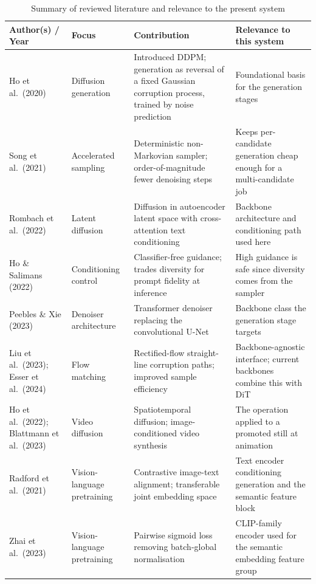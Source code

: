 \documentclass[conference]{IEEEtran}
\begin{document}
\begin{table}[t]
\caption{Summary of reviewed literature and relevance to the present system}
\label{tab:lit}
\centering
\tiny
\begin{tabular}{@{}p{2.7cm}p{2.3cm}p{5.0cm}p{5.4cm}@{}}
\toprule
\textbf{Author(s) / Year} & \textbf{Focus} & \textbf{Contribution} & \textbf{Relevance to this system} \\
\midrule
Ho et al.\ (2020) \cite{ho2020ddpm} & Diffusion generation & Introduced DDPM; generation as reversal of a fixed Gaussian corruption process, trained by noise prediction & Foundational basis for the generation stages \\
Song et al.\ (2021) \cite{song2021ddim} & Accelerated sampling & Deterministic non-Markovian sampler; order-of-magnitude fewer denoising steps & Keeps per-candidate generation cheap enough for a multi-candidate job \\
Rombach et al.\ (2022) \cite{rombach2022ldm} & Latent diffusion & Diffusion in autoencoder latent space with cross-attention text conditioning & Backbone architecture and conditioning path used here \\
Ho \& Salimans (2022) \cite{ho2022cfg} & Conditioning control & Classifier-free guidance; trades diversity for prompt fidelity at inference & High guidance is safe since diversity comes from the sampler \\
Peebles \& Xie (2023) \cite{peebles2023dit} & Denoiser architecture & Transformer denoiser replacing the convolutional U-Net & Backbone class the generation stage targets \\
Liu et al.\ (2023); Esser et al.\ (2024) \cite{liu2023rectflow,esser2024sd3} & Flow matching & Rectified-flow straight-line corruption paths; improved sample efficiency & Backbone-agnostic interface; current backbones combine this with DiT \\
Ho et al.\ (2022); Blattmann et al.\ (2023) \cite{ho2022vdm,blattmann2023svd} & Video diffusion & Spatiotemporal diffusion; image-conditioned video synthesis & The operation applied to a promoted still at animation \\
Radford et al.\ (2021) \cite{radford2021clip} & Vision-language pretraining & Contrastive image-text alignment; transferable joint embedding space & Text encoder conditioning generation and the semantic feature block \\
Zhai et al.\ (2023) \cite{zhai2023siglip} & Vision-language pretraining & Pairwise sigmoid loss removing batch-global normalisation & CLIP-family encoder used for the semantic embedding feature group \\

\end{tabular}
\end{table}
\end{document}
